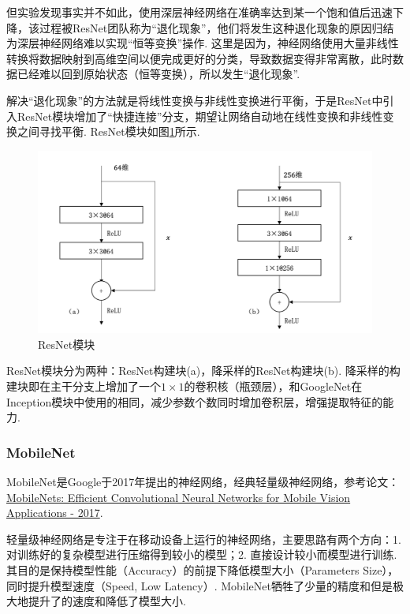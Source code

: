 \documentclass[12pt, a4paper, oneside]{ctexart}
\numberwithin{equation}{section}  %
\begin{document}
但实验发现事实并不如此，使用深层神经网络在准确率达到某一个饱和值后迅速下降，该过程被ResNet团队称为“退化现象”，他们将发生这种退化现象的原因归结为深层神经网络难以实现“恒等变换”操作. 这里是因为，神经网络使用大量非线性转换将数据映射到高维空间以便完成更好的分类，导致数据变得非常离散，此时数据已经难以回到原始状态（恒等变换），所以发生“退化现象”.

解决“退化现象”的方法就是将线性变换与非线性变换进行平衡，于是ResNet中引入ResNet模块增加了“快捷连接”分支，期望让网络自动地在线性变换和非线性变换之间寻找平衡. ResNet模块如图\ref{fig-ResNet}所示.
\begin{figure}[htbp]
  \centering
  \includegraphics[scale=0.8]{ResNet模块.png}
  \caption{ResNet模块\protect\footnotemark[1]}
  \label{fig-ResNet}
\end{figure}

ResNet模块分为两种：ResNet构建块(a)，降采样的ResNet构建块(b). 降采样的构建块即在主干分支上增加了一个$1\times 1$的卷积核（瓶颈层），和GoogleNet在Inception模块中使用的相同，减少参数个数同时增加卷积层，增强提取特征的能力.

\subsubsection{MobileNet}
MobileNet是Google于2017年提出的神经网络，经典轻量级神经网络，参考论文：\href{https://arxiv.org/pdf/1704.04861.pdf}{MobileNets: Efficient Convolutional Neural Networks for Mobile Vision Applications - 2017}.

轻量级神经网络是专注于在移动设备上运行的神经网络，主要思路有两个方向：1. 对训练好的复杂模型进行压缩得到较小的模型；2. 直接设计较小而模型进行训练. 其目的是保持模型性能（Accuracy）的前提下降低模型大小（Parameters Size），同时提升模型速度（Speed, Low Latency）. MobileNet牺牲了少量的精度和但是极大地提升了的速度和降低了模型大小.
\end{document}
